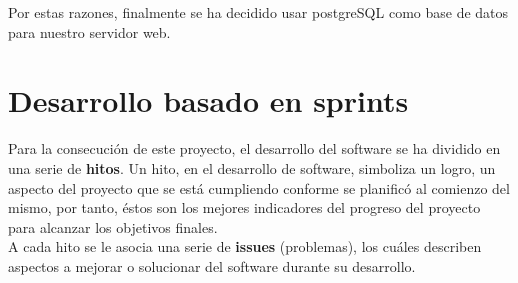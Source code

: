     Por estas razones, finalmente se ha decidido usar postgreSQL como base de datos para
    nuestro servidor web.

\section{Desarrollo basado en sprints}
Para la consecución de este proyecto, el desarrollo del software se ha dividido en una serie
de \textbf{hitos}. Un hito, en el desarrollo de software, simboliza un logro, un aspecto
del proyecto que se está cumpliendo conforme se planificó al comienzo del mismo, por tanto, 
éstos son los mejores indicadores del progreso del proyecto para alcanzar los objetivos
finales.\\

A cada hito se le asocia una serie de \textbf{issues} (problemas), los cuáles describen
aspectos a mejorar o solucionar del software durante su desarrollo. \\

